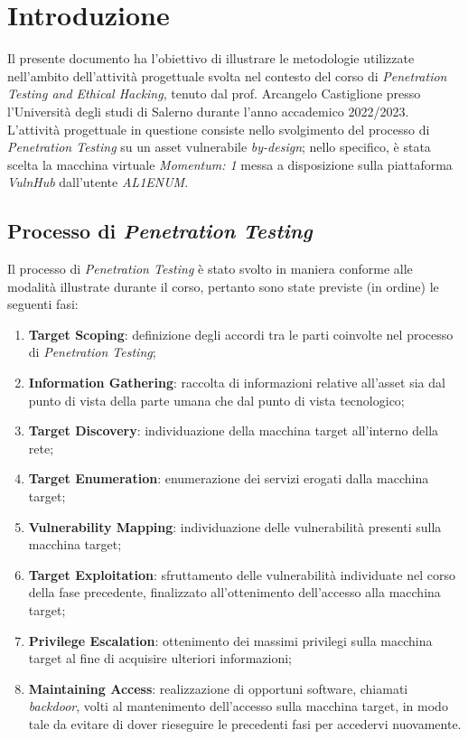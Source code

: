 \chapter{Introduzione}
Il presente documento ha l'obiettivo di illustrare le metodologie utilizzate nell'ambito dell'attività progettuale svolta nel contesto del corso di \emph{Penetration Testing and Ethical Hacking}, tenuto dal prof. Arcangelo Castiglione presso l'Università degli studi di Salerno durante l'anno accademico 2022/2023. L'attività progettuale in questione consiste nello svolgimento del processo di \emph{Penetration Testing} su un asset vulnerabile \emph{by-design}; nello specifico, è stata scelta la macchina virtuale \emph{Momentum: 1} messa a disposizione sulla piattaforma \emph{VulnHub} dall'utente \emph{AL1ENUM}. 

\section{Processo di \emph{Penetration Testing}}
Il processo di \emph{Penetration Testing} è stato svolto in maniera conforme alle modalità illustrate durante il corso, pertanto sono state previste (in ordine) le seguenti fasi:
\begin{enumerate}
    \item \textbf{Target Scoping}: definizione degli accordi tra le parti coinvolte nel processo di \emph{Penetration Testing};
    \item \textbf{Information Gathering}: raccolta di informazioni relative all'asset sia dal punto di vista della parte umana che dal punto di vista tecnologico;
    \item \textbf{Target Discovery}: individuazione della macchina target all'interno della rete;
    \item \textbf{Target Enumeration}: enumerazione dei servizi erogati dalla macchina target;
    \item \textbf{Vulnerability Mapping}: individuazione delle vulnerabilità presenti sulla macchina target;
    \item \textbf{Target Exploitation}: sfruttamento delle vulnerabilità individuate nel corso della fase precedente, finalizzato all'ottenimento dell'accesso alla macchina target;
    \item \textbf{Privilege Escalation}: ottenimento dei massimi privilegi sulla macchina target al fine di acquisire ulteriori informazioni;
    \item \textbf{Maintaining Access}: realizzazione di opportuni software, chiamati \emph{backdoor}, volti al mantenimento dell'accesso sulla macchina target, in modo tale da evitare di dover rieseguire le precedenti fasi per accedervi nuovamente.
\end{enumerate}

